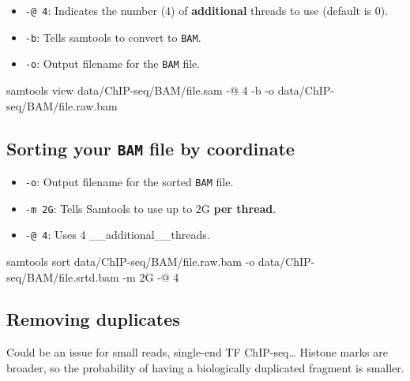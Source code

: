 \documentclass[]{article}
\newenvironment{Shaded}{\begin{snugshade}}{\end{snugshade}}
\newcommand{\ExtensionTok}[1]{#1}
\newcommand{\NormalTok}[1]{#1}
\providecommand{\tightlist}{%
  \setlength{\itemsep}{0pt}\setlength{\parskip}{0pt}}
\begin{document}
\begin{itemize}
\tightlist
\item
  \texttt{-@\ 4}: Indicates the number (4) of \textbf{additional}
  threads to use (default is 0).
\item
  \texttt{-b}: Tells samtools to convert to \texttt{BAM}.
\item
  \texttt{-o}: Output filename for the \texttt{BAM} file.
\end{itemize}

\begin{Shaded}
\begin{Highlighting}[]
\ExtensionTok{samtools}\NormalTok{ view data/ChIP-seq/BAM/file.sam -@ 4 -b -o data/ChIP-seq/BAM/file.raw.bam}
\end{Highlighting}
\end{Shaded}

\subsection{\texorpdfstring{Sorting your \texttt{BAM} file by
coordinate}{Sorting your BAM file by coordinate}}\label{sorting-your-bam-file-by-coordinate}

\begin{itemize}
\tightlist
\item
  \texttt{-o}: Output filename for the sorted \texttt{BAM} file.
\item
  \texttt{-m\ 2G}: Tells Samtools to use up to 2G \textbf{per thread}.
\item
  \texttt{-@\ 4}: Uses 4 \_\_additional\_\_threads.
\end{itemize}

\begin{Shaded}
\begin{Highlighting}[]
\ExtensionTok{samtools}\NormalTok{ sort data/ChIP-seq/BAM/file.raw.bam -o data/ChIP-seq/BAM/file.srtd.bam -m 2G -@ 4}
\end{Highlighting}
\end{Shaded}

\subsection{Removing duplicates}\label{removing-duplicates}

Could be an issue for small reads, single-end TF ChIP-seq\ldots{}
Histone marks are broader, so the probability of having a biologically
duplicated fragment is smaller.
\end{document}
